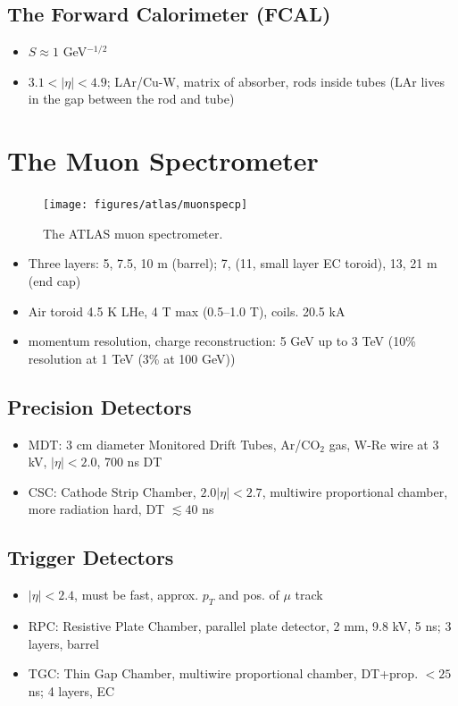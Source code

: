 \subsection{The Forward Calorimeter (FCAL)}
\begin{itemize}
\item $S\approx1$ GeV$^{-1/2}$
\item $3.1<\left|\eta\right|<4.9$; LAr/Cu-W, matrix of absorber, rods inside tubes (LAr lives in the gap between the rod and tube)
\end{itemize}


\section{The Muon Spectrometer}
\begin{figure}[!htbp]\captionsetup{justification=centering}
  \centering
  \texttt{[image: figures/atlas/muonspecp]}
  \caption{The ATLAS muon spectrometer.}
  \label{fig:ms}
\end{figure}
\begin{itemize}
\item Three layers: 5, 7.5, 10 m (barrel); 7, (11, small layer EC toroid), 13, 21 m (end cap)
\item Air toroid 4.5 K LHe, 4 T max (0.5--1.0 T), coils. 20.5 kA
\item momentum resolution, charge reconstruction: 5 GeV up to 3 TeV (10\% resolution at 1 TeV (3\% at 100 GeV)) 
\end{itemize}
\subsection{Precision Detectors}
\begin{itemize}
\item MDT: 3 cm diameter Monitored Drift Tubes, Ar/CO$_2$ gas, W-Re wire at 3 kV, $\left|\eta\right|<2.0$, 700 ns DT
\item CSC: Cathode Strip Chamber, $2.0\left|\eta\right|<2.7$,  multiwire proportional chamber, more radiation hard, DT $\lesssim40$ ns
\end{itemize}
\subsection{Trigger Detectors}
\begin{itemize}
\item $\left|\eta\right|< 2.4$, must be fast, approx. $p_T$ and pos. of $\mu$ track
\item RPC: Resistive Plate Chamber, parallel plate detector, 2 mm, 9.8 kV, 5 ns; 3 layers, barrel
\item TGC: Thin Gap Chamber, multiwire proportional chamber, DT+prop. $<25$ ns; 4 layers, EC
\end{itemize}


